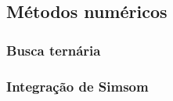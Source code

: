 \subsection{Métodos numéricos}

\subsubsection{Busca ternária}


\subsubsection{Integração de Simsom}

